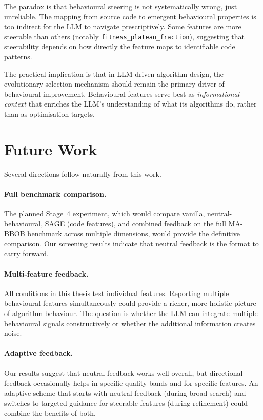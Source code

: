 The paradox is that behavioural steering is not systematically wrong, just unreliable. The mapping from source code to emergent behavioural properties is too indirect for the LLM to navigate prescriptively. Some features are more steerable than others (notably \texttt{fitness\_plateau\_fraction}), suggesting that steerability depends on how directly the feature maps to identifiable code patterns.

The practical implication is that in LLM-driven algorithm design, the evolutionary selection mechanism should remain the primary driver of behavioural improvement. Behavioural features serve best as \emph{informational context} that enriches the LLM's understanding of what its algorithms do, rather than as optimisation targets.

\section{Future Work}
\label{sec:conc-future}

Several directions follow naturally from this work.

\paragraph{Full benchmark comparison.}
The planned Stage~4 experiment, which would compare vanilla, neutral-behavioural, SAGE (code features), and combined feedback on the full MA-BBOB benchmark across multiple dimensions, would provide the definitive comparison. Our screening results indicate that neutral feedback is the format to carry forward.

\paragraph{Multi-feature feedback.}
All conditions in this thesis test individual features. Reporting multiple behavioural features simultaneously could provide a richer, more holistic picture of algorithm behaviour. The question is whether the LLM can integrate multiple behavioural signals constructively or whether the additional information creates noise.

\paragraph{Adaptive feedback.}
Our results suggest that neutral feedback works well overall, but directional feedback occasionally helps in specific quality bands and for specific features. An adaptive scheme that starts with neutral feedback (during broad search) and switches to targeted guidance for steerable features (during refinement) could combine the benefits of both.

